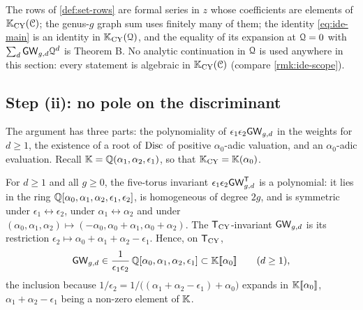 \begin{rmk}
\label{rmk:rig-rows}
The rows of \cref{def:set-rows} are formal series in $z$ whose coefficients are elements of $\mathbb{K}_{\mathrm{CY}}(\mathcal{C})$; the genus-$g$ graph sum uses finitely many of them; the identity \eqref{eq:ide-main} is an identity in $\mathbb{K}_{\mathrm{CY}}(\mathcal{Q})$, and the equality of its expansion at $\mathcal{Q}=0$ with $\sum_d\mathsf{GW}_{g,d}\mathcal{Q}^d$ is Theorem B. No analytic continuation in $\mathcal{Q}$ is used anywhere in this section: every statement is algebraic in $\mathbb{K}_{\mathrm{CY}}(\mathcal{C})$ (compare \cref{rmk:ide-scope}).
\end{rmk}

\subsection{Step (ii): no pole on the discriminant}

The argument has three parts: the polynomiality of $\epsilon_1\epsilon_2\mathsf{GW}_{g,d}$ in the weights for $d\geq 1$, the existence of a root of $\operatorname{Disc}$ of positive $\alpha_0$-adic valuation, and an $\alpha_0$-adic evaluation. Recall $\mathbb{K}=\mathbb{Q}(\alpha_1,\alpha_2,\epsilon_1)$, so that $\mathbb{K}_{\mathrm{CY}}=\mathbb{K}(\alpha_0)$.

\begin{lem}[polynomiality]
\label{lem:rig-poly}
For $d\geq 1$ and all $g\geq 0$, the five-torus invariant $\epsilon_1\epsilon_2\mathsf{GW}^{\mathsf{T}}_{g,d}$ is a polynomial: it lies in the ring $\mathbb{Q}[\alpha_0,\alpha_1,\alpha_2,\epsilon_1,\epsilon_2]$, is homogeneous of degree $2g$, and is symmetric under $\epsilon_1\leftrightarrow\epsilon_2$, under $\alpha_1\leftrightarrow\alpha_2$ and under $(\alpha_0,\alpha_1,\alpha_2)\mapsto(-\alpha_0,\alpha_0+\alpha_1,\alpha_0+\alpha_2)$. The $\mathsf{T}_{\mathrm{CY}}$-invariant $\mathsf{GW}_{g,d}$ is its restriction $\epsilon_2\mapsto\alpha_0+\alpha_1+\alpha_2-\epsilon_1$. Hence, on $\mathsf{T}_{\mathrm{CY}}$,
\[
\mathsf{GW}_{g,d}\in\frac{1}{\epsilon_1\epsilon_2}\,\mathbb{Q}[\alpha_0,\alpha_1,\alpha_2,\epsilon_1]\subset\mathbb{K}[\![ \alpha_0 ]\!]\qquad(d\geq 1),
\]
the inclusion because $1/\epsilon_2=1/\big((\alpha_1+\alpha_2-\epsilon_1)+\alpha_0\big)$ expands in $\mathbb{K}[\![ \alpha_0 ]\!]$, $\alpha_1+\alpha_2-\epsilon_1$ being a non-zero element of $\mathbb{K}$.
\end{lem}

